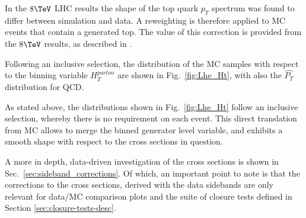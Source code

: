 In the $8\tev$ LHC results the shape of the top quark $p_{T}$ spectrum
was found to differ between simulation and data. A reweighting is
therefore applied to MC events that contain a generated top. The value of
this correction is provided from the $8\tev$ results, as described in
\cite{twiki-TopPtReweighting}.

Following an inclusive selection, the distribution of the MC samples with respect to the binning variable $H_{T}^{parton}$ are shown in Fig.~\ref{fig:Lhe_Ht}, with
also the $\hat{P_{T}}$ distribution for QCD.

As stated above, the distributions shown in Fig.~\ref{fig:Lhe_Ht} follow an inclusive selection, whereby there is no requirement on each event. This direct translation
from MC allows to merge the binned generator level variable, and exhibits a smooth shape with respect to the cross sections in question.

A more in depth, data-driven investigation of the cross sections is shown in Sec.~\ref{sec:sideband_corrections}. Of which, an important point to note is that
the corrections to the cross sections, derived with the data sidebands are only relevant for data/MC comparison plots and the suite of closure tests defined in Section \ref{sec:closure-tests-desc}.

